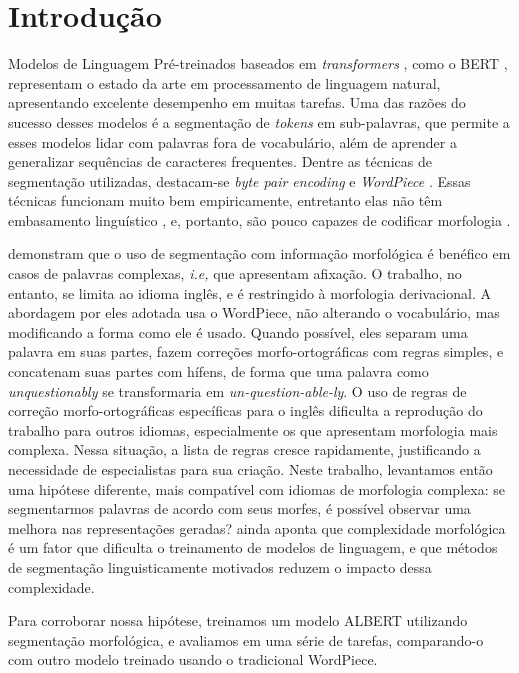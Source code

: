 \documentclass[cic,tc]{iiufrgs}
\begin{document}
\chapter{Introdução}

Modelos de Linguagem Pré-treinados baseados em \emph{transformers} \cite{vaswani-etal-2017}, como o BERT \cite{devlin-etal-2019-bert}, representam o estado da arte em processamento de linguagem natural, apresentando excelente desempenho em muitas tarefas. Uma das razões do sucesso desses modelos é a segmentação de \emph{tokens} em sub-palavras, que permite a esses modelos lidar com palavras fora de vocabulário, além de aprender a generalizar sequências de caracteres frequentes. Dentre as técnicas de segmentação utilizadas, destacam-se \emph{byte pair encoding} \cite{sennrich-etal-2016-neural} e \emph{WordPiece} \cite{Wu2016GooglesNM}. Essas técnicas funcionam muito bem empiricamente, entretanto elas não têm embasamento linguístico \cite{Church2020May}, e, portanto, são pouco capazes de codificar morfologia \cite{klein-tsarfaty-2020-getting}.

\citet{Hofmann2021SuperbizarreIN} demonstram que o uso de segmentação com informação morfológica é benéfico em casos de palavras complexas, \textit{i.e,} que apresentam afixação. O trabalho, no entanto, se limita ao idioma inglês, e é restringido à morfologia derivacional. A abordagem por eles adotada usa o WordPiece, não alterando o vocabulário, mas modificando a forma como ele é usado. Quando possível, eles separam uma palavra em suas partes, fazem correções morfo-ortográficas com regras simples, e concatenam suas partes com hífens, de forma que uma palavra como \emph{unquestionably} se transformaria em \emph{un-question-able-ly}. O uso de regras de correção morfo-ortográficas específicas para o inglês dificulta a reprodução do trabalho para outros idiomas, especialmente os que apresentam morfologia mais complexa. Nessa situação, a lista de regras cresce rapidamente, justificando a necessidade de especialistas para sua criação. Neste trabalho, levantamos então uma hipótese diferente, mais compatível com idiomas de morfologia complexa: se segmentarmos palavras de acordo com seus morfes, é possível observar uma melhora nas representações geradas? \citet{morphology-matters-tacl-2021} ainda aponta que complexidade morfológica é um fator que dificulta o treinamento de modelos de linguagem, e que métodos de segmentação linguisticamente motivados reduzem o impacto dessa complexidade.

Para corroborar nossa hipótese, treinamos um modelo ALBERT \cite{Lan2020ALBERT} utilizando segmentação morfológica, e avaliamos em uma série de tarefas, comparando-o com outro modelo treinado usando o tradicional WordPiece.
\end{document}
